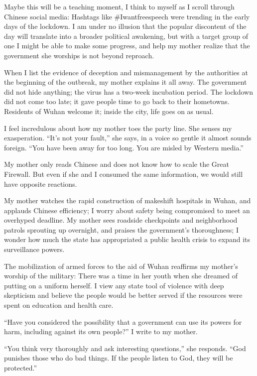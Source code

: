 Maybe this will be a teaching moment, I think to myself as I scroll
through Chinese social media: Hashtags like \#Iwantfreespeech were
trending in the early days of the lockdown. I am under no illusion that
the popular discontent of the day will translate into a broader
political awakening, but with a target group of one I might be able to
make some progress, and help my mother realize that the government she
worships is not beyond reproach.

When I list the evidence of deception and mismanagement by the
authorities at the beginning of the outbreak, my mother explains it all
away. The government did not hide anything; the virus has a two-week
incubation period. The lockdown did not come too late; it gave people
time to go back to their hometowns. Residents of Wuhan welcome it;
inside the city, life goes on as usual.

I feel incredulous about how my mother toes the party line. She senses
my exasperation. ``It's not your fault,'' she says, in a voice so gentle
it almost sounds foreign. ``You have been away for too long. You are
misled by Western media.''

My mother only reads Chinese and does not know how to scale the Great
Firewall. But even if she and I consumed the same information, we would
still have opposite reactions.

My mother watches the rapid construction of makeshift hospitals in
Wuhan, and applauds Chinese efficiency; I worry about safety being
compromised to meet an overhyped deadline. My mother sees roadside
checkpoints and neighborhood patrols sprouting up overnight, and praises
the government's thoroughness; I wonder how much the state has
appropriated a public health crisis to expand its surveillance powers.

The mobilization of armed forces to the aid of Wuhan reaffirms my
mother's worship of the military: There was a time in her youth when she
dreamed of putting on a uniform herself. I view any state tool of
violence with deep skepticism and believe the people would be better
served if the resources were spent on education and health care.

``Have you considered the possibility that a government can use its
powers for harm, including against its own people?'' I write to my
mother.

``You think very thoroughly and ask interesting questions,'' she
responds. ``God punishes those who do bad things. If the people listen
to God, they will be protected.''

